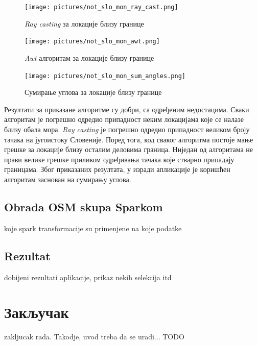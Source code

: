 \documentclass[12pt,oneside]{memoir}
\begin{document}
\begin{figure}[!ht]
  \centering
  \texttt{[image: pictures/not\_slo\_mon\_ray\_cast.png]}
  \caption{\textit{Ray casting} за локације близу границе}
  \label{fig:not_slo_mon_rc}
\end{figure}

\begin{figure}[!ht]
  \centering
  \texttt{[image: pictures/not\_slo\_mon\_awt.png]}
  \caption{\textit{Awt} алгоритам за локације близу границе}
  \label{fig:not_slo_mon_awt}
\end{figure}

\begin{figure}[!ht]
  \centering
  \texttt{[image: pictures/not\_slo\_mon\_sum\_angles.png]}
  \caption{Сумирање углова за локације близу границе}
  \label{fig:not_slo_mon_sum_angles}
\end{figure}

Резултати за приказане алгоритме су добри, са одређеним недостацима. Сваки алгоритам је погрешно одредио припадност неким локацијама које се налазе близу обала мора. \textit{Ray casting} је погрешно одредио припадност великом броју тачака на југоистоку Словеније. Поред тога, код сваког алгоритма постоје мање грешке за локације близу осталим деловима граница. Ниједан од алгоритама не прави велике грешке приликом одређивања тачака које стварно припадају границама. Због приказаних резултата, у изради апликације је коришћен алгоритам заснован на сумирању углова.

\section{Obrada OSM skupa Sparkom}
\label{sec:osm_spark_obrada}

koje spark transformacije su primenjene na koje podatke

\section{Rezultat}
\label{sec:rezultat}

dobijeni rezultati aplikacije, prikaz nekih selekcija itd

\chapter{Закључак}
\label{chp:zakljucak}

zakljucak rada. Takodje, uvod treba da se uradi... TODO

\end{document}
